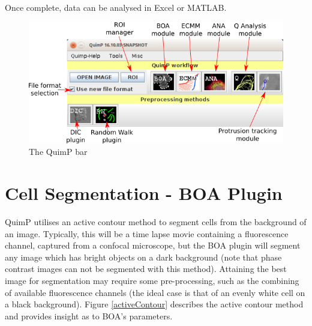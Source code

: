 \documentclass[a4paper,12pt]{article}
\begin{document}
Once complete, data can be analysed in Excel or MATLAB.

\begin{figure}[ht]
   \centering
   \includegraphics[width=15cm]{quimpBar.png} %
   \caption{The QuimP bar}
   \label{fig:quimpBar}
\end{figure}


\section{Cell Segmentation - BOA Plugin}

QuimP utilises an active contour method to segment cells from the background of an image.  Typically, this will be a 
time lapse movie containing a fluorescence channel, captured from a confocal microscope, but the BOA plugin will 
segment any image which has bright objects on a dark background (note that phase contrast images can not be 
segmented with this method).  Attaining the best image for segmentation may require some pre-processing, such 
as the combining of available fluorescence channels (the ideal case is that of an evenly white cell on a black 
background).  Figure \ref{activeContour} describes the active contour method and provides insight as to BOA's 
parameters.\\
\end{document}
